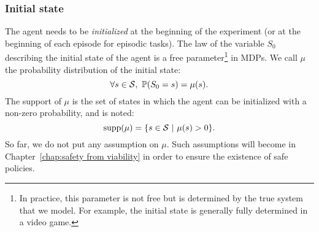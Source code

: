 		\subsubsection{Initial state} 
			The agent needs to be\emph{ initialized} at the beginning of the experiment (or at the beginning of each episode for episodic tasks). The law of the variable $S_0$ describing the initial state of the agent is a free parameter\footnote{In practice, this parameter is not free but is determined by the true system that we model. For example, the initial state is generally fully determined in a video game.} in MDPs. We call $\mu$ the probability distribution of the initial state:
			\begin{equation*}
				\forall s\in\S,~\P(S_0 = s) = \mu(s).
			\end{equation*}
			The support of $\mu$ is the set of states in which the agent can be initialized with a non-zero probability, and is noted:
			\begin{equation*}
				\support(\mu) = \{s\in\S~|~\mu(s) > 0\}.
			\end{equation*}
			So far, we do not put any assumption on $\mu$. Such assumptions will become in Chapter~\ref{chap:safety from viability} in order to ensure the existence of safe policies.
